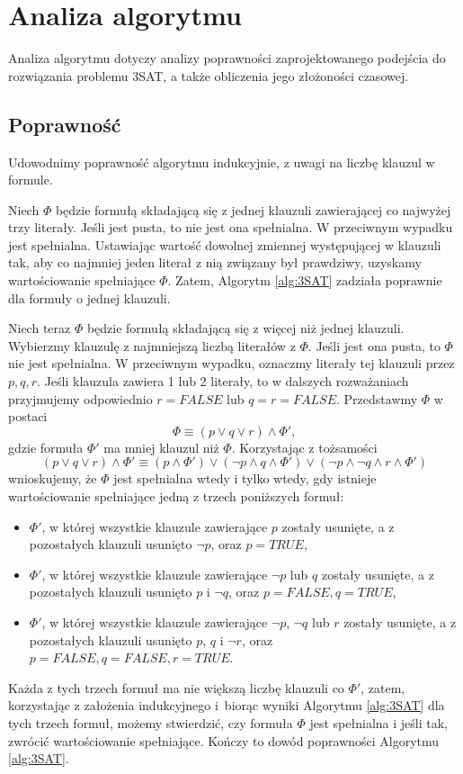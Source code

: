 \documentclass[a4paper,10pt,twoside]{report}
\theoremstyle{definition}
\begin{document}
\section{Analiza algorytmu}

Analiza algorytmu dotyczy analizy poprawności zaprojektowanego podejścia do rozwiązania problemu 3SAT, a także obliczenia jego złożoności czasowej.

\subsection{Poprawność}

Udowodnimy poprawność algorytmu indukcyjnie, z uwagi na liczbę klauzul w formule. 

Niech $\Phi$ będzie formułą składającą się z jednej klauzuli zawierającej co najwyżej trzy literały. Jeśli jest pusta, to nie jest ona spełnialna. W przeciwnym wypadku jest spełnialna. Ustawiając wartość dowolnej zmiennej występującej w klauzuli tak, aby co najmniej jeden literał z nią związany był prawdziwy, uzyskamy wartościowanie spełniające $\Phi$. Zatem, Algorytm \ref{alg:3SAT} zadziała poprawnie dla formuły o jednej klauzuli.

Niech teraz $\Phi$ będzie formułą składającą się z więcej niż jednej klauzuli. Wybierzmy  klauzulę z najmniejszą liczbą literałów z $\Phi$. Jeśli jest ona pusta, to $\Phi$ nie jest spełnialna. W przeciwnym wypadku, oznaczmy literały tej klauzuli przez $p,q,r$. Jeśli klauzula zawiera 1 lub 2 literały, to w dalszych rozważaniach przyjmujemy odpowiednio $r=FALSE$ lub $q=r=FALSE$. Przedstawmy $\Phi$ w postaci
\begin{equation}
    \Phi \equiv (p\vee q\vee r) \wedge \Phi',
\end{equation}
gdzie formuła $\Phi'$ ma mniej klauzul niż $\Phi$. Korzystając z tożsamości
\begin{equation}
    (p\vee q\vee r) \wedge \Phi' \equiv (p \wedge \Phi') \vee (\neg p \wedge q \wedge \Phi') \vee (\neg p\wedge \neg q\wedge r \wedge \Phi')
\end{equation}
wnioskujemy, że $\Phi$ jest spełnialna wtedy i tylko wtedy, gdy istnieje wartościowanie spełniające jedną z trzech poniższych formuł:
\begin{itemize}
    \item $\Phi'$, w której wszystkie klauzule zawierające $p$ zostały usunięte, a z pozostałych klauzuli usunięto $\neg p$, oraz $p=TRUE$,
    \item $\Phi'$, w której wszystkie klauzule zawierające $\neg p$ lub $q$ zostały usunięte, a z pozostałych klauzuli usunięto $p$ i $\neg q$, oraz $p=FALSE, q=TRUE$,
    \item $\Phi'$, w której wszystkie klauzule zawierające $\neg p$, $\neg q$ lub $r$ zostały usunięte, a z pozostałych klauzuli usunięto $p$, $q$ i $\neg r$, oraz $p=FALSE, q=FALSE, r=TRUE$.
\end{itemize}
Każda z tych trzech formuł ma nie większą liczbę klauzuli co $\Phi'$, zatem, korzystając z założenia indukcyjnego i~biorąc wyniki Algorytmu \ref{alg:3SAT} dla tych trzech formuł, możemy stwierdzić, czy formuła $\Phi$ jest spełnialna i jeśli tak, zwrócić wartościowanie spełniające. Kończy to dowód poprawności Algorytmu \ref{alg:3SAT}.
\end{document}

